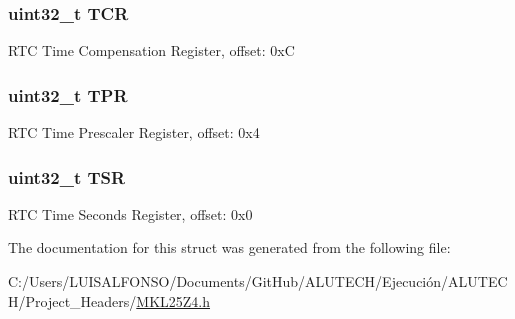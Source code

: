 \subsubsection[{T\+C\+R}]{\setlength{\rightskip}{0pt plus 5cm}uint32\+\_\+t T\+C\+R}\label{struct_r_t_c___mem_map_a9a53e49441f15ba5815fbffc87f2819f}
R\+T\+C Time Compensation Register, offset\+: 0x\+C \hypertarget{struct_r_t_c___mem_map_afbf8ee068cab47ab0b25805c5b7ef91c}{}
\subsubsection[{T\+P\+R}]{\setlength{\rightskip}{0pt plus 5cm}uint32\+\_\+t T\+P\+R}\label{struct_r_t_c___mem_map_afbf8ee068cab47ab0b25805c5b7ef91c}
R\+T\+C Time Prescaler Register, offset\+: 0x4 \hypertarget{struct_r_t_c___mem_map_a57e02b30db8442e215456ffebf82326a}{}
\subsubsection[{T\+S\+R}]{\setlength{\rightskip}{0pt plus 5cm}uint32\+\_\+t T\+S\+R}\label{struct_r_t_c___mem_map_a57e02b30db8442e215456ffebf82326a}
R\+T\+C Time Seconds Register, offset\+: 0x0 

The documentation for this struct was generated from the following file\+:\begin{DoxyCompactItemize}
\item 
C\+:/\+Users/\+L\+U\+I\+S\+A\+L\+F\+O\+N\+S\+O/\+Documents/\+Git\+Hub/\+A\+L\+U\+T\+E\+C\+H/\+Ejecución/\+A\+L\+U\+T\+E\+C\+H/\+Project\+\_\+\+Headers/\hyperlink{_m_k_l25_z4_8h}{M\+K\+L25\+Z4.\+h}\end{DoxyCompactItemize}
